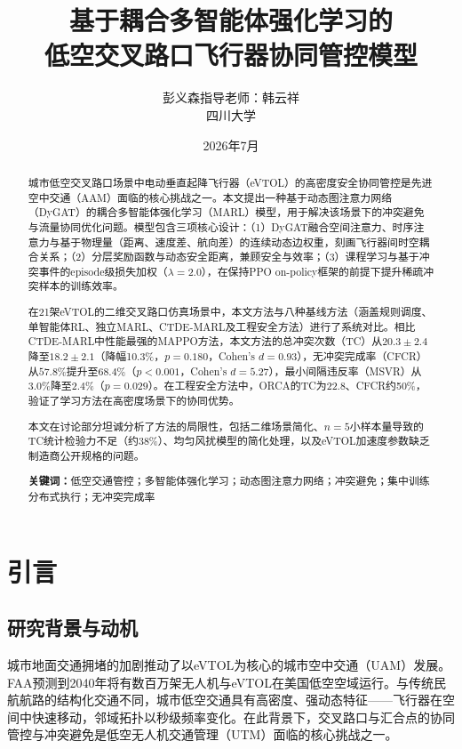 \documentclass[12pt,a4paper,UTF8]{ctexart}
\title{\textbf{基于耦合多智能体强化学习的\\低空交叉路口飞行器协同管控模型}}
\author{彭义森\quad 指导老师：韩云祥\\[4pt]\small 四川大学}
\date{2026年7月}
\begin{document}
\maketitle

\begin{abstract}
城市低空交叉路口场景中电动垂直起降飞行器（eVTOL）的高密度安全协同管控是先进空中交通（AAM）面临的核心挑战之一。本文提出一种基于动态图注意力网络（DyGAT）的耦合多智能体强化学习（MARL）模型，用于解决该场景下的冲突避免与流量协同优化问题。模型包含三项核心设计：（1）DyGAT融合空间注意力、时序注意力与基于物理量（距离、速度差、航向差）的连续动态边权重，刻画飞行器间时空耦合关系；（2）分层奖励函数与动态安全距离，兼顾安全与效率；（3）课程学习与基于冲突事件的episode级损失加权（$\lambda=2.0$），在保持PPO on-policy框架的前提下提升稀疏冲突样本的训练效率。

在21架eVTOL的二维交叉路口仿真场景中，本文方法与八种基线方法（涵盖规则调度、单智能体RL、独立MARL、CTDE-MARL及工程安全方法）进行了系统对比。相比CTDE-MARL中性能最强的MAPPO方法，本文方法的总冲突次数（TC）从$20.3\pm2.4$降至$18.2\pm2.1$（降幅10.3\%，$p=0.180$，Cohen's $d=0.93$），无冲突完成率（CFCR）从$57.8\%$提升至$68.4\%$（$p<0.001$，Cohen's $d=5.27$），最小间隔违反率（MSVR）从$3.0\%$降至$2.4\%$（$p=0.029$）。在工程安全方法中，ORCA的TC为22.8、CFCR约50\%，验证了学习方法在高密度场景下的协同优势。

本文在讨论部分坦诚分析了方法的局限性，包括二维场景简化、$n=5$小样本量导致的TC统计检验力不足（约38\%）、均匀风扰模型的简化处理，以及eVTOL加速度参数缺乏制造商公开规格的问题。

\noindent\textbf{关键词：}低空交通管控；多智能体强化学习；动态图注意力网络；冲突避免；集中训练分布式执行；无冲突完成率
\end{abstract}

\section{引言}

\subsection{研究背景与动机}

城市地面交通拥堵的加剧推动了以eVTOL为核心的城市空中交通（UAM）发展。FAA预测到2040年将有数百万架无人机与eVTOL在美国低空空域运行\cite{ref1}。与传统民航航路的结构化交通不同，城市低空交通具有高密度、强动态特征——飞行器在空间中快速移动，邻域拓扑以秒级频率变化。在此背景下，交叉路口与汇合点的协同管控与冲突避免是低空无人机交通管理（UTM）面临的核心挑战之一。
\end{document}
